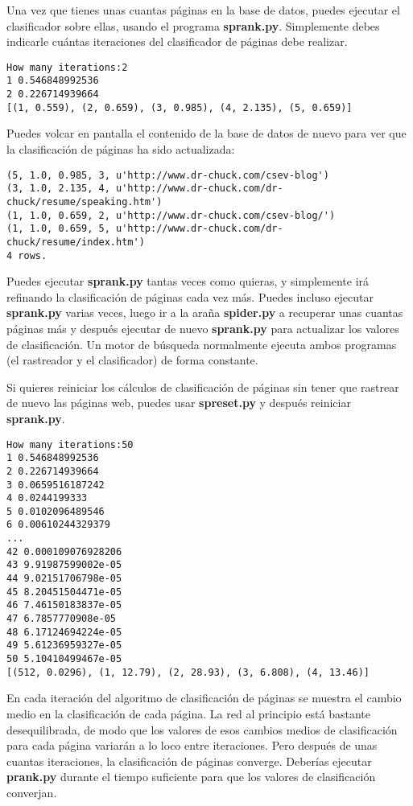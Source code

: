 Una vez que tienes unas cuantas páginas en la base de datos, puedes ejecutar el clasificador sobre ellas, usando el programa {\bf sprank.py}. Simplemente debes indicarle cuántas
iteraciones del clasificador de páginas debe realizar.

\beforeverb
\begin{verbatim}
How many iterations:2
1 0.546848992536
2 0.226714939664
[(1, 0.559), (2, 0.659), (3, 0.985), (4, 2.135), (5, 0.659)]
\end{verbatim}
\afterverb
%
Puedes volcar en pantalla el contenido de la base de datos de nuevo para ver que la clasificación de
páginas ha sido actualizada:

\beforeverb
\begin{verbatim}
(5, 1.0, 0.985, 3, u'http://www.dr-chuck.com/csev-blog')
(3, 1.0, 2.135, 4, u'http://www.dr-chuck.com/dr-chuck/resume/speaking.htm')
(1, 1.0, 0.659, 2, u'http://www.dr-chuck.com/csev-blog/')
(1, 1.0, 0.659, 5, u'http://www.dr-chuck.com/dr-chuck/resume/index.htm')
4 rows.
\end{verbatim}
\afterverb
%
Puedes ejecutar {\bf sprank.py} tantas veces como quieras, y simplemente irá refinando
la clasificación de páginas cada vez más. Puedes incluso ejecutar {\bf sprank.py} varias veces,
luego ir a la araña {\bf spider.py} a recuperar unas cuantas páginas más y después ejecutar de nuevo
{\bf sprank.py} para actualizar los valores de clasificación. Un motor de búsqueda normalmente
ejecuta ambos programas (el rastreador y el clasificador) de forma constante.

Si quieres reiniciar los cálculos de clasificación de páginas sin tener que rastrear de nuevo
las páginas web, puedes usar {\bf spreset.py} y después reiniciar {\bf sprank.py}.

\beforeverb
\begin{verbatim}
How many iterations:50
1 0.546848992536
2 0.226714939664
3 0.0659516187242
4 0.0244199333
5 0.0102096489546
6 0.00610244329379
...
42 0.000109076928206
43 9.91987599002e-05
44 9.02151706798e-05
45 8.20451504471e-05
46 7.46150183837e-05
47 6.7857770908e-05
48 6.17124694224e-05
49 5.61236959327e-05
50 5.10410499467e-05
[(512, 0.0296), (1, 12.79), (2, 28.93), (3, 6.808), (4, 13.46)]
\end{verbatim}
\afterverb
%
En cada iteración del algoritmo de clasificación de páginas se muestra el cambio
medio en la clasificación de cada página. La red al principio está bastante
desequilibrada, de modo que los valores de esos cambios medios de clasificación
para cada página variarán a lo loco entre iteraciones. Pero después de unas cuantas
iteraciones, la clasificación de páginas converge. Deberías
ejecutar {\bf prank.py} durante el tiempo suficiente para que los valores de clasificación
converjan.

